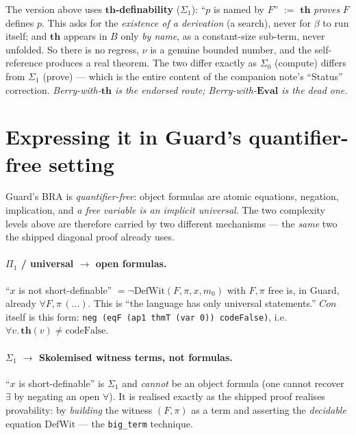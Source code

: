 \documentclass[11pt]{article}
\theoremstyle{plain}
\theoremstyle{definition}
\theoremstyle{remark}
\newcommand{\Con}{\mathit{Con}}
\newcommand{\thmT}{\mathbf{th}}
\newcommand{\Eval}{\mathbf{Eval}}
\begin{document}
The version above uses \textbf{$\thmT$-definability} ($\Sigma_1$):
``$p$ is named by $F$'' $:=$ $\thmT$ \emph{proves} $F$ defines $p$.  This
asks for the \emph{existence of a derivation} (a search), never for
$\beta$ to run itself; and $\thmT$ appears in $B$ only \emph{by name}, as
a constant-size sub-term, never unfolded.  So there is no regress, $\nu$
is a genuine bounded number, and the self-reference produces a real
theorem.  The two differ exactly as $\Sigma_0$ (compute) differs from
$\Sigma_1$ (prove) --- which is the entire content of the companion
note's ``Status'' correction.  \emph{Berry-with-$\thmT$ is the endorsed
route; Berry-with-$\Eval$ is the dead one.}

\section{Expressing it in Guard's quantifier-free setting}
\label{sec:guard}

Guard's BRA is \emph{quantifier-free}: object formulas are atomic
equations, negation, implication, and \emph{a free variable is an
implicit universal}.  The two complexity levels above are therefore
carried by two different mechanisms --- the \emph{same} two the shipped
diagonal proof already uses.

\paragraph{$\Pi_1$ / universal $\to$ open formulas.}  ``$x$ is not
short-definable'' $=\neg\mathrm{DefWit}(F,\pi,x,m_0)$ with $F,\pi$ free
is, in Guard, already $\forall F,\pi\,(\dots)$.  This is ``the language
has only universal statements.''  $\Con$ itself is this form:
\texttt{neg (eqF (ap1 thmT (var 0)) codeFalse)}, i.e.\
$\forall v.\,\thmT(v)\neq\mathrm{codeFalse}$.

\paragraph{$\Sigma_1$ $\to$ Skolemised witness terms, not formulas.}
``$x$ is short-definable'' is $\Sigma_1$ and \emph{cannot} be an object
formula (one cannot recover $\exists$ by negating an open $\forall$).  It
is realised exactly as the shipped proof realises provability: by
\emph{building} the witness $(F,\pi)$ as a term and asserting the
\emph{decidable} equation $\mathrm{DefWit}$ --- the \texttt{big\_term}
technique.
\end{document}
